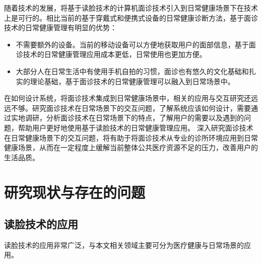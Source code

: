 

随着技术的发展，将基于读脸技术的计算机面诊技术引入到日常健康场景下在技术上是可行的。相比当前的基于穿戴式和便携式设备的日常健康诊断方法，基于面诊技术的日常健康管理有明显的优势：

\begin{itemize}
    \item 不需要额外的设备。当前的移动设备可以方便地获取用户的面部信息，基于面诊技术的日常健康管理应用成本更低，日常使用也更加方便。
    
    \item 大部分人在日常生活中有使用手机自拍的习惯，面诊也有悠久的文化基础和扎实的理论基础，基于面诊技术的日常健康管理可以融入到日常场景中。
\end{itemize}

在如何设计系统，将面诊技术集成到日常健康场景中，相关的应用与交互研究还远远不够。研究面诊技术在日常场景下的交互问题，了解系统应该如何设计，需要通过实地调研，分析面诊技术在日常场景下的特点，了解用户的需要以及遇到的问题，帮助用户更好地使用基于读脸技术的日常健康管理应用。
深入研究面诊技术在日常健康场景下的交互问题，将有助于将面诊技术从专业的诊所环境应用到日常健康场景，从而在一定程度上缓解当前整体公共医疗资源不足的压力，改善用户的生活品质。



\section{研究现状与存在的问题}


\subsection{读脸技术的应用}
读脸技术的应用非常广泛，与本文相关领域主要可分为医疗健康与日常场景的应用。

